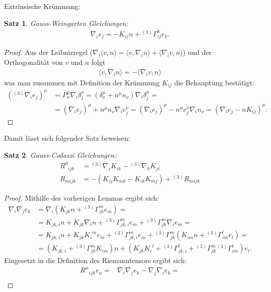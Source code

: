 \documentclass{scrartcl}
\newtheorem{theorem}{Satz}
\newcommand{\inHS}{{}^{(3)}\!}
\begin{document}
\begin{paragraph}{Extrinsische Krümmung:}
		\begin{theorem} Gauss-Weingarten Gleichungen:
			\begin{align}
				\nabla_i e_j=-K_{ij}n+{}^{(3)}\Gamma^k_{ij}e_k.
			\end{align}
		\end{theorem}
		\begin{proof}
			Aus der Leibnizregel ($\nabla_i \langle v,n\rangle =\langle v,\nabla_i n\rangle + \langle \nabla_i v,n\rangle$) und der Orthogonalität von $v$ und $n$ folgt
			\begin{align*}
				\langle v,\nabla_i n\rangle = -\langle \nabla_i v,n\rangle
			\end{align*}
			was man zusammen mit Definition der Krümmung $K_{ij}$ die Behauptung bestätigt:
			\begin{align*}
				(\inHS\nabla_i e_j)^\mu&=P^\mu_\nu\nabla_i\delta^\nu_j=(\delta^\mu_\nu + n^\mu n_\nu)\nabla_i \delta^\mu_j=\\
				&=(\nabla_i e_j)^\mu + n^\mu n_\nu\nabla_i e_j^\nu=(\nabla_i e_j)^\mu - n^\mu e_j^\nu\nabla_i n_\nu=(\nabla_i e_j - n K_{ij})^\mu.
			\end{align*}
		\end{proof}
		Damit lässt sich folgender Satz beweisen:
		\begin{theorem} Gauss-Codazzi Gleichungen:
			\begin{align}
				{R^0}_{ijk}&=\inHS\nabla_j K_{ik}-\inHS\nabla_k K_{ji} \\
				R_{mijk}&=-(K_{ij}K_{mk}-K_{ik}K_{mj})+\inHS R_{mijk}
			\end{align}
			\label{thm:gce}
		\end{theorem}
		\begin{proof}
			Mithilfe des vorherigen Lemmas ergibt sich:
			\begin{align*}
				\nabla_i\nabla_j e_k &= \nabla_i(K_{jk}n+\inHS\Gamma^m_{jk}e_m)=\\
									 &= K_{jk,i}n+K_{jk}\nabla_i n+\inHS\Gamma^m_{jk,i}e_m+\inHS\Gamma^m_{jk}\nabla_i e_m=\\
									 &= K_{jk,i}n+K_{jk}{K_i}^m e_m+\inHS\Gamma^m_{jk,i}e_m+\inHS\Gamma^m_{jk}(K_{im}n+\inHS\Gamma^l_{im}e_l)=\\
									 &= (K_{jk,i}+\inHS\Gamma^m_{jk}K_{im})n+(K_{jk}{K_i}^l+\inHS\Gamma^l_{jk,i}+\inHS\Gamma^m_{jk}\inHS\Gamma^l_{im})e_l.
			\end{align*}
			Eingesetzt in die Definition des Riemanntensors ergibt sich:
			\begin{align*}
				{R^\alpha}_{ijk}e_\alpha =&\nabla_i\nabla_j e_k-\nabla_j\nabla_i e_k=\\

\end{align*}
\end{proof}
\end{paragraph}
\end{document}
